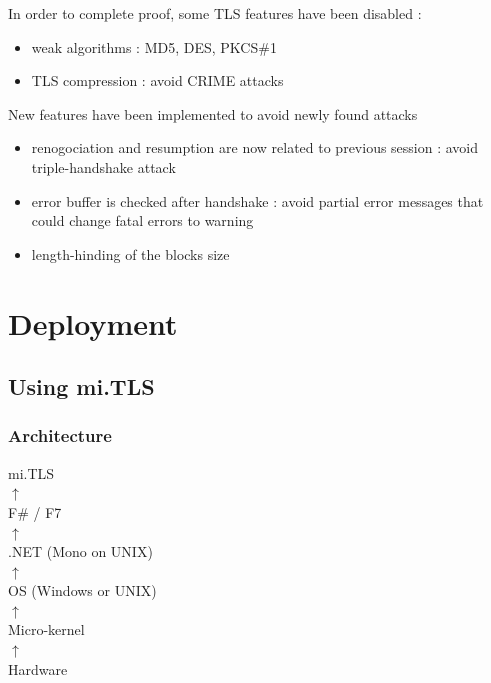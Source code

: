 \documentclass{beamer}
\begin{document}
\begin{frame}
  In order to complete proof, some TLS features have been disabled :
  \begin{itemize}
  \item weak algorithms : MD5, DES, PKCS\#1
  \item TLS compression : avoid CRIME attacks
  \end{itemize}
  \vfill
  New features have been implemented to avoid newly found attacks
  \begin{itemize}
  \item renogociation and resumption are now related to previous session : avoid triple-handshake attack
  \item error buffer is checked after handshake : avoid partial error messages that could change fatal errors to warning
  \item length-hinding of the blocks size
  \end{itemize}

\end{frame}



\section{Deployment}


\begin{frame}
    \tableofcontents[currentsection]
\end{frame}


\subsection{Using mi.TLS}




\begin{frame}
    \frametitle{Architecture}
    
    \begin{table}
        mi.TLS\\
        $\uparrow$\\
        F\# / F7\\
        $\uparrow$\\
        .NET (Mono on UNIX)\\
        $\uparrow$\\
        OS (Windows or UNIX)\\
        $\uparrow$\\
        Micro-kernel\\
        $\uparrow$\\
        Hardware\\
    \end{table}
\end{frame}
\end{document}
